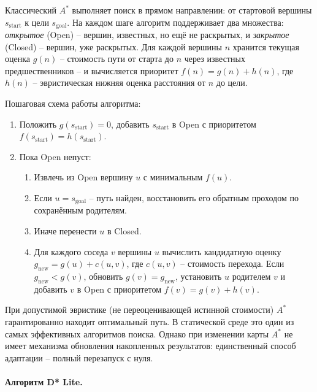 \documentclass[a4paper,12pt]{extarticle}
\begin{document}
    Классический $A^*$ выполняет поиск в прямом направлении: от стартовой вершины $s_\text{start}$ к цели $s_\text{goal}$. На каждом шаге алгоритм поддерживает два множества: \emph{открытое} (Open) -- вершин, известных, но ещё не раскрытых, и \emph{закрытое} (Closed) -- вершин, уже раскрытых. Для каждой вершины $n$ хранится текущая оценка $g(n)$ -- стоимость пути от старта до $n$ через известных предшественников -- и вычисляется приоритет $f(n) = g(n) + h(n)$, где $h(n)$ -- эвристическая нижняя оценка расстояния от $n$ до цели.

    Пошаговая схема работы алгоритма:
    \begin{enumerate}
        \item Положить $g(s_\text{start}) = 0$, добавить $s_\text{start}$ в Open с приоритетом $f(s_\text{start}) = h(s_\text{start})$.
        \item Пока Open непуст:
            \begin{enumerate}
                \item Извлечь из Open вершину $u$ с минимальным $f(u)$.
                \item Если $u = s_\text{goal}$ -- путь найден, восстановить его обратным проходом по сохранённым родителям.
                \item Иначе перенести $u$ в Closed.
                \item Для каждого соседа $v$ вершины $u$ вычислить кандидатную оценку $g_\text{new} = g(u) + c(u, v)$, где $c(u, v)$ -- стоимость перехода. Если $g_\text{new} < g(v)$, обновить $g(v) = g_\text{new}$, установить $u$ родителем $v$ и добавить $v$ в Open с приоритетом $f(v) = g(v) + h(v)$.
            \end{enumerate}
    \end{enumerate}

    При допустимой эвристике (не переоценивающей истинной стоимости) $A^*$ гарантированно находит оптимальный путь. В статической среде это один из самых эффективных алгоритмов поиска. Однако при изменении карты $A^*$ не имеет механизма обновления накопленных результатов: единственный способ адаптации -- полный перезапуск с нуля.

    \paragraph{Алгоритм D* Lite.}
\end{document}
